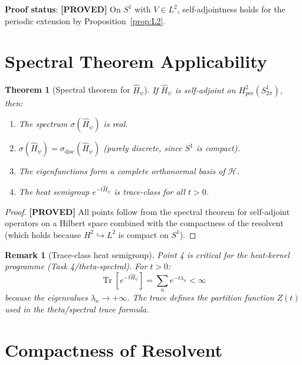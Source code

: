 \documentclass[11pt,a4paper]{article}
\newtheorem{theorem}{Theorem}
\newtheorem{remark}{Remark}
\newcommand{\proved}[1]{\textbf{[PROVED]} #1}
\begin{document}
\textbf{Proof status}: \proved{On $S^1$ with $V \in L^2$, self-adjointness holds
for the periodic extension by Proposition~\ref{prop:L2}.}

\section{Spectral Theorem Applicability}

\begin{theorem}[Spectral theorem for $\hat{H}_\psi$]
  If $\hat{H}_\psi$ is self-adjoint on $H^2_\mathrm{per}(S^1_{2\pi})$, then:
  \begin{enumerate}
    \item The spectrum $\sigma(\hat{H}_\psi)$ is real.
    \item $\sigma(\hat{H}_\psi) = \sigma_\mathrm{disc}(\hat{H}_\psi)$ (purely
          discrete, since $S^1$ is compact).
    \item The eigenfunctions form a complete orthonormal basis of $\mathscr{H}$.
    \item The heat semigroup $e^{-t\hat{H}_\psi}$ is trace-class for all $t > 0$.
  \end{enumerate}
\end{theorem}

\begin{proof}
  \proved{All points follow from the spectral theorem for self-adjoint operators
  on a Hilbert space \cite[Thm.\ VIII.6]{ReedSimon1} combined with the
  compactness of the resolvent (which holds because $H^2 \hookrightarrow L^2$
  is compact on $S^1$).}
\end{proof}

\begin{remark}[Trace-class heat semigroup]
  Point 4 is critical for the heat-kernel programme (Task 4/theta-spectral).
  For $t > 0$:
  \[
    \operatorname{Tr}[e^{-t\hat{H}_\psi}] = \sum_n e^{-t\lambda_n} < \infty
  \]
  because the eigenvalues $\lambda_n \to +\infty$.  The trace defines the
  partition function $Z(t)$ used in the theta/spectral trace formula.
\end{remark}

\section{Compactness of Resolvent}
\end{document}

